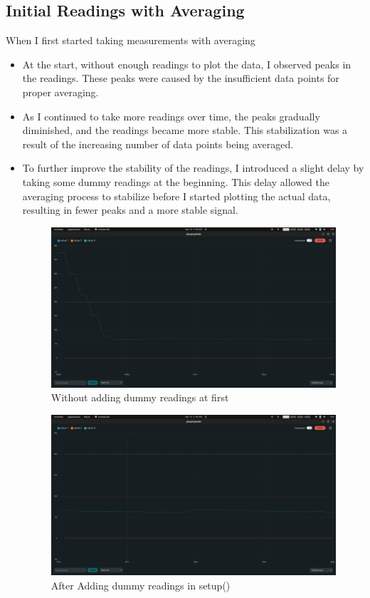 \documentclass[a4paper,11pt]{article}%
\begin{document}
\subsection{Initial Readings with Averaging}
When I first started taking measurements with averaging
\begin{itemize}
  \item At the start, without enough readings to plot the data, I observed peaks in the readings. These peaks were caused by the insufficient data points for proper averaging.
  \item As I continued to take more readings over time, the peaks gradually diminished, and the readings became more stable. This stabilization was a result of the increasing number of data points being averaged.
  \item To further improve the stability of the readings, I introduced a slight delay by taking some dummy readings at the beginning. This delay allowed the averaging process to stabilize before I started plotting the actual data, resulting in fewer peaks and a more stable signal.
        \begin{figure}[H]
          \centering
          \includegraphics[scale=0.2]{figures/initial_peak.png}
          \caption{Without adding dummy readings at first}
        \end{figure}

        \begin{figure}[H]
          \centering
          \includegraphics[scale=0.2]{figures/after_stabilizing.png}
          \caption{After Adding dummy readings in setup()}
        \end{figure}


\end{itemize}
\end{document}
